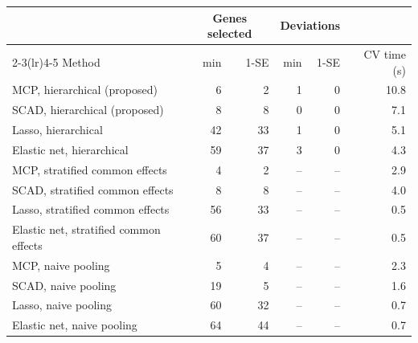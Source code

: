 \begin{tabular}{@{}lrrrrr@{}}
\toprule
& \multicolumn{2}{c}{Genes selected} & \multicolumn{2}{c}{Deviations} & \\
\cmidrule(lr){2-3}\cmidrule(lr){4-5}
Method & min & 1-SE & min & 1-SE & CV time (s) \\
\midrule
MCP, hierarchical (proposed) & 6 & 2 & 1 & 0 & 10.8 \\
SCAD, hierarchical (proposed) & 8 & 8 & 0 & 0 & 7.1 \\
Lasso, hierarchical & 42 & 33 & 1 & 0 & 5.1 \\
Elastic net, hierarchical & 59 & 37 & 3 & 0 & 4.3 \\
MCP, stratified common effects & 4 & 2 & -- & -- & 2.9 \\
SCAD, stratified common effects & 8 & 8 & -- & -- & 4.0 \\
Lasso, stratified common effects & 56 & 33 & -- & -- & 0.5 \\
Elastic net, stratified common effects & 60 & 37 & -- & -- & 0.5 \\
MCP, naive pooling & 5 & 4 & -- & -- & 2.3 \\
SCAD, naive pooling & 19 & 5 & -- & -- & 1.6 \\
Lasso, naive pooling & 60 & 32 & -- & -- & 0.7 \\
Elastic net, naive pooling & 64 & 44 & -- & -- & 0.7 \\
\bottomrule
\end{tabular}
